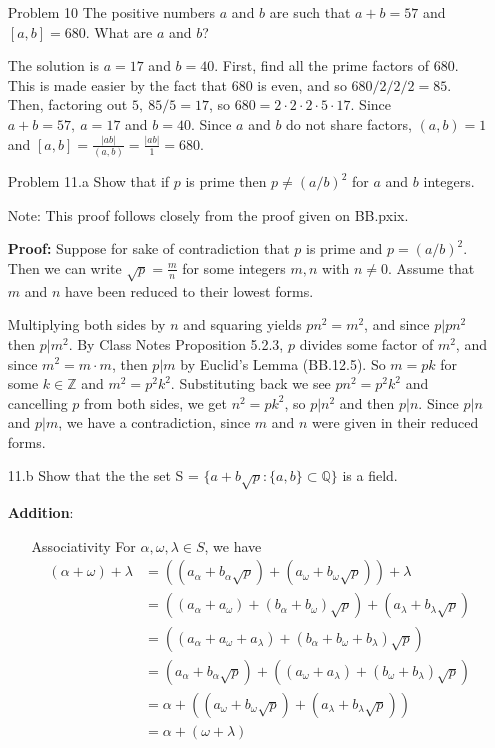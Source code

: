 \documentclass[letterpaper]{article}
\newcommand{\Rationals}{\mathbb{Q}}
\newcommand{\Integers}{\mathbb{Z}}
\begin{document}
\begin{itemize}
      \item[Problem 10] The positive numbers \(a\) and \(b\) are such that \(a + b = 57\) and \([a, b] = 680\). What are \(a\) and \(b\)?

            The solution is \(a = 17\) and \(b = 40\). First, find all the prime factors of 680. This is made easier by the fact that 680 is even, and so \(680 / 2 /2 / 2 = 85\). Then, factoring out  \(5,\ 85 / 5 = 17\), so \(680 = 2\cdot 2\cdot 2\cdot 5\cdot 17\). Since \(a + b = 57,\ a = 17\) and \(b = 40\). Since \(a\) and \(b\) do not share factors, \((a,b) = 1\) and \([a, b] = \frac{|ab|}{(a,b)} = \frac{|ab|}{1} = 680\).

      \item[Problem 11.a] Show that if \(p\) is prime then \(p \neq (a/b)^2\) for \(a\) and \(b\) integers.

            Note: This proof follows closely from the proof given on BB.pxix.

            \textbf{Proof: } Suppose for sake of contradiction that  \(p\) is prime and \(p = (a/b)^2\). Then we can write \(\sqrt{p} = \frac{m}{n}\) for some integers \(m, n\) with \(n \neq 0\). Assume that \(m\) and \(n\) have been reduced to their lowest forms.

            Multiplying both sides by \(n\) and squaring yields \(pn^2 = m^2\), and since \(p|pn^2\) then \(p|m^2\). By Class Notes Proposition 5.2.3, \(p\) divides some factor of \(m^2\), and since \(m^2 = m\cdot m\), then \(p|m\) by Euclid's Lemma (BB.12.5). So \(m = pk\) for some \(k \in \Integers\) and \(m^2 = p^2k^2\). Substituting back we see \(pn^2 = p^2k^2\) and cancelling \(p\) from both sides, we get \(n^2 = pk^2\), so \(p|n^2\) and then \(p|n\). Since \(p|n\) and \(p|m\), we have a contradiction, since \(m\) and \(n\) were given in their reduced forms.

      \item[11.b] Show that the the set S = \(\{a + b\sqrt{p} : \{a, b\} \subset \Rationals\}\) is a field.

            \textbf{Addition}:
            \begin{itemize}
                  \item[Associativity] For \(\alpha,\omega,\lambda\in S\), we have
                        \begin{align*}
                              (\alpha + \omega) + \lambda & =  ((a_\alpha + b_\alpha\sqrt{p}) + (a_\omega + b_\omega\sqrt{p})) + \lambda \\& =  ((a_\alpha + a_\omega) + (b_\alpha + b_\omega)\sqrt{p}) + (a_\lambda + b_\lambda\sqrt{p}) \\&= ((a_\alpha + a_\omega + a_\lambda ) + (b_\alpha + b_\omega + b_\lambda)\sqrt{p}) \\&=
                              (a_\alpha + b_\alpha\sqrt{p}) + ((a_\omega + a_\lambda) + (b_\omega + b_\lambda)\sqrt{p})                  \\& = \alpha + ((a_\omega +b_\omega\sqrt{p})  + (a_\lambda + b_\lambda\sqrt{p})) \\ & =  \alpha + (\omega + \lambda)
                        \end{align*}


\end{itemize}
\end{itemize}
\end{document}
